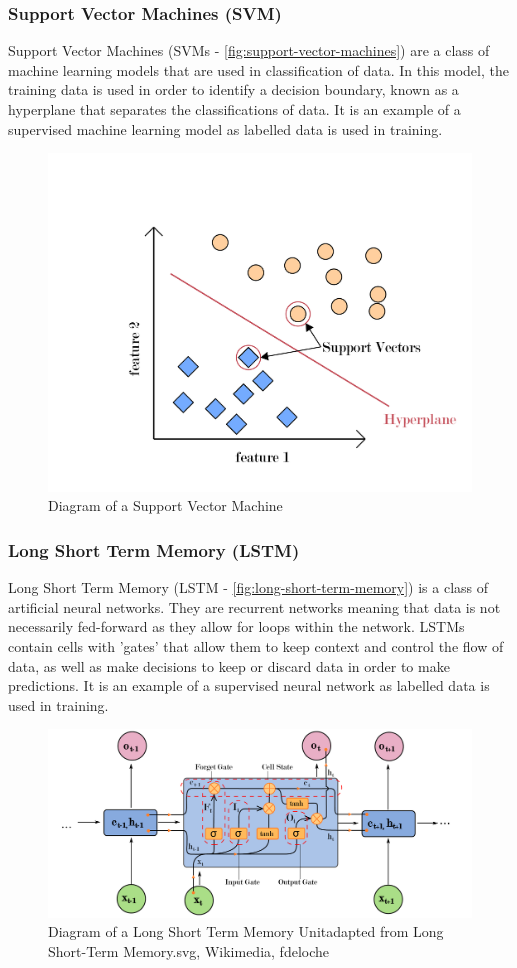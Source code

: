 \subsubsection{Support Vector Machines (SVM)}
Support Vector Machines (SVMs - \autoref{fig:support-vector-machines}) are a class of machine learning models that are used in classification
of data. In this model, the training data is used in order to identify a decision boundary, known as
a hyperplane that separates the classifications of data. It is an example of a supervised machine
learning model as labelled data is used in training.
\begin{figure}[hbt!]
    \centering
    \includegraphics[width=0.6\columnwidth]{figures/support-vector-machines.pdf}
    \caption[Diagram of a Support Vector Machine]{Diagram of a Support Vector Machine}
    \label{fig:support-vector-machines}
\end{figure}
\FloatBarrier

\subsubsection{Long Short Term Memory (LSTM)}
Long Short Term Memory (LSTM - \autoref{fig:long-short-term-memory}) is a class of artificial neural networks. They are recurrent
networks meaning that data is not necessarily fed-forward as they allow for loops within the
network. LSTMs contain cells with 'gates' that allow them to keep context and control the flow of data,
as well as make decisions to keep or discard data in order to make predictions. It is an example of a supervised neural network as labelled data is used in training.

\begin{figure}[hbt!]
    \centering
    \includegraphics[width=\columnwidth]{figures/long-short-term-memory.pdf}
    \caption[Diagram of a LSTM Unit]{Diagram of a Long Short Term Memory Unitadapted from Long Short-Term Memory.svg, Wikimedia, fdeloche}
    \label{fig:long-short-term-memory}
\end{figure}
\FloatBarrier

